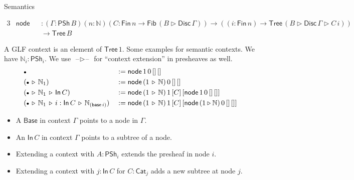 \documentclass[dvipsnames,aspectratio=169]{beamer}
\newcommand{\ms}[1]{\mathsf{#1}}
\newcommand{\mbb}[1]{\mathbb{#1}}
\newcommand{\blank}{\mathord{\hspace{1pt}\text{--}\hspace{1pt}}}
\newcommand{\Fib}{\mathsf{Fib}}
\newcommand{\Fin}{\mathsf{Fin}}
\newcommand{\Tree}{\mathsf{Tree}}
\newcommand{\Disc}{\mathsf{Disc}}
\newcommand{\Base}{\mathsf{Base}}
\newcommand{\In}{\mathsf{In}}
\newcommand{\PSh}{\mathsf{PSh}}
\newcommand{\Cat}{\mathsf{Cat}}
\newcommand{\base}{\mathsf{base}}
\newcommand{\ext}{\triangleright}
\newcommand{\emptycon}{\scaleobj{.75}\bullet}
\begin{document}
\begin{frame}{Semantics}

\begin{block}{}
\vspace{-1em}
{\small
\begin{alignat*}{3}
  & \ms{node} &&: (\Gamma : \PSh\,B)(n : \mbb{N})(C : \Fin\,n \to \Fib\,(B \ext \Disc\,\Gamma)) \to ((i : \Fin\,n) \to \Tree\,(B \ext \Disc\,\Gamma \ext C\,i)) \\
  & &&\to \Tree\,B
\end{alignat*}
}
\end{block}
\vspace{0.5em}

A GLF context is an element of $\Tree\,1$. Some examples for semantic contexts. We have $\mbb{N}_i : \PSh_i$. We use $\blank\ext\blank$ for ``context extension'' in presheaves as well.
\begin{alignat*}{3}
  & \emptycon &&:= \ms{node}\,1\,0\,[]\,[]\\
  & (\emptycon\,\ext\,\mbb{N}_1) &&:= \ms{node}\,(1\,\ext\,\mbb{N})\,0\,[]\,[]\\
  & (\emptycon\,\ext\,\mbb{N}_1\,\ext\,\In\,C) &&:= \ms{node}\,(1\,\ext\,\mbb{N})\,1\,[C]\,[\ms{node}\,1\,0\,[]\,[]]\\
  & (\emptycon\,\ext\,\mbb{N}_1\,\ext\,i : \In\,C\,\ext\,\mbb{N}_{(\base\,i)}) &&:= \ms{node}\,(1\,\ext\,\mbb{N})\,1\,[C]\,[\ms{node}\,(1 \ext \mbb{N})\,0\,[]\,[]]
\end{alignat*}
\vspace{-1em}
\pause

\begin{itemize}
\item A $\Base$ in context $\Gamma$ points to a node in $\Gamma$.
\item An $\In\,C$ in context $\Gamma$ points to a subtree of a node.
\item Extending a context with $A : \PSh_i$ extends the presheaf in node $i$.
\item Extending a context with $j : \In\,C$ for $C : \Cat_j$ adds a new subtree at node $j$.
\end{itemize}
\end{frame}
\end{document}
